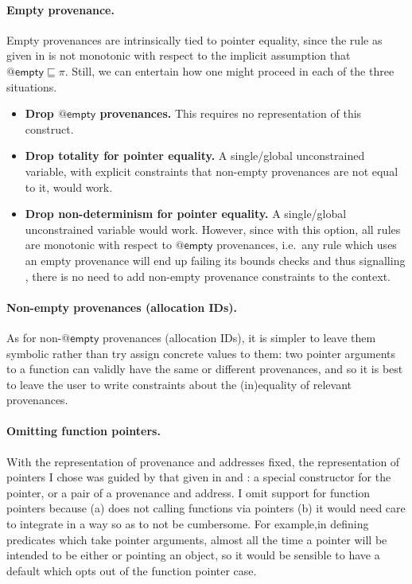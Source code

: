 \paragraph{Empty provenance.}%
Empty provenances are intrinsically tied to pointer equality, since the rule
as given in  is not monotonic with respect to the implicit assumption
that $@\mathsf{empty} \sqsubseteq \pi$. Still, we can entertain how one might
proceed in each of the three situations.
\begin{itemize}
    \item \textbf{Drop $@\mathsf{empty}$ provenances.} This requires
        no representation of this construct.
    \item \textbf{Drop totality for pointer equality.}
        A single/global unconstrained variable, with explicit constraints that
        non-empty provenances are not equal to it, would work.
    \item \textbf{Drop non-determinism for pointer equality.}
        A single/global unconstrained variable would work. However, since with
        this option, all rules are monotonic with respect to $@\mathsf{empty}$
        provenances, i.e.\ any rule which uses an empty provenance will end up
        failing its bounds checks and thus signalling , there is no need
        to add non-empty provenance constraints to the context.
\end{itemize}

\paragraph{Non-empty provenances (allocation IDs).}%
As for non-$@\mathsf{empty}$ provenances (allocation IDs), it is simpler to
leave them symbolic rather than try assign concrete values to them: two pointer
arguments to a function can validly have the same or different provenances, and
so it is best to leave the user to write constraints about the (in)equality of %
relevant provenances.

\paragraph{Omitting function pointers.}%
With the representation of provenance and addresses fixed, the representation
of pointers I chose was guided by that given in  and :
a special constructor for the  pointer, or a pair of a
provenance and address. I omit support for function pointers
because (a)  does not calling functions via pointers (b) it would need
care to integrate in a way so as to not be cumbersome. For example,in defining
predicates which take pointer arguments, almost all the time a pointer will be
intended to be either  or pointing an object, so it would be sensible to
have a default which opts out of the function pointer case.

